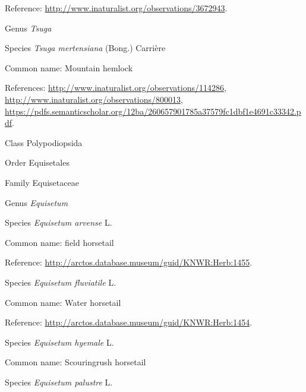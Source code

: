 \documentclass[9pt, article]{memoir}
\begin{document}
\begin{multicols}{2}
Reference: 
\url{http://www.inaturalist.org/observations/3672943}.

\vspace{6pt}\noindent\hspace{30pt}Genus \textit{Tsuga}


\vspace{6pt}\noindent\hspace{36pt}Species \textit{Tsuga mertensiana} (Bong.) Carrière


Common name: Mountain hemlock

References: 
\url{http://www.inaturalist.org/observations/114286}, 
\url{http://www.inaturalist.org/observations/800013}, 
\url{https://pdfs.semanticscholar.org/12ba/260657901785a37579fc1dbf1e4691c33342.pdf}.

\vspace{6pt}\noindent\hspace{12pt}Class Polypodiopsida


\vspace{6pt}\noindent\hspace{18pt}Order Equisetales


\vspace{6pt}\noindent\hspace{24pt}Family Equisetaceae


\vspace{6pt}\noindent\hspace{30pt}Genus \textit{Equisetum}


\vspace{6pt}\noindent\hspace{36pt}Species \textit{Equisetum arvense} L.


Common name: field horsetail

Reference: 
\url{http://arctos.database.museum/guid/KNWR:Herb:1455}.

\vspace{6pt}\noindent\hspace{36pt}Species \textit{Equisetum fluviatile} L.


Common name: Water horsetail

Reference: 
\url{http://arctos.database.museum/guid/KNWR:Herb:1454}.

\vspace{6pt}\noindent\hspace{36pt}Species \textit{Equisetum hyemale} L.


Common name: Scouringrush horsetail

\vspace{6pt}\noindent\hspace{36pt}Species \textit{Equisetum palustre} L.



\end{multicols}
\end{document}
